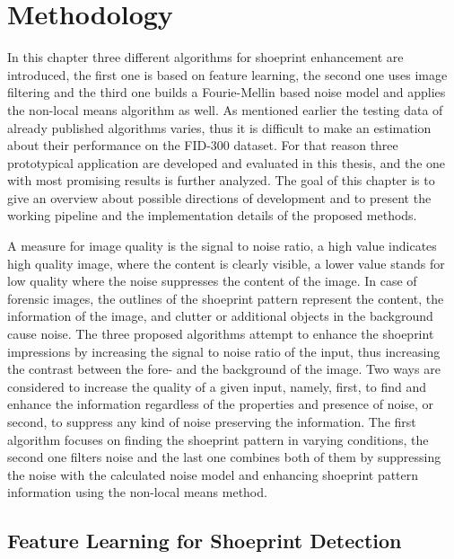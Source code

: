 \documentclass[draft,final]{vutinfth} %
\begin{document}
\chapter{Methodology}

\par
In this chapter three different algorithms for shoeprint enhancement are introduced, the first one is based on feature learning, the second one uses image filtering and the third one builds a Fourie-Mellin based noise model and applies the non-local means algorithm as well.
As mentioned earlier the testing data of already published algorithms varies, thus it is difficult to make an estimation about their performance on the FID-300  \cite{kortylewski2014unsupervised} dataset.
For that reason three prototypical application are developed and evaluated in this thesis, and the one with most promising results is further analyzed.
The goal of this chapter is to give an overview about possible directions of development and to present the working pipeline and the implementation details of the proposed methods.
\par
A measure for image quality is the signal to noise ratio, a high value indicates high quality image, where the content is clearly visible, a lower value stands for low quality where the noise suppresses the content of the image.
In case of forensic images, the outlines of the shoeprint pattern represent the content, the information of the image, and clutter or additional objects in the background cause noise. 
The three proposed algorithms attempt to enhance the shoeprint impressions by increasing the signal to noise ratio of the input, thus increasing the contrast between the fore- and the background of the image.
Two ways are considered to increase the quality of a given input, namely, first, to find and enhance the information regardless of the properties and presence of noise, or second, to suppress any kind of noise preserving the information. 
The first algorithm focuses on finding the shoeprint pattern in varying conditions, the second one filters noise and the last one combines both of them by suppressing the noise with the calculated noise model and enhancing shoeprint pattern information using the non-local means method.

\section{Feature Learning for Shoeprint Detection}
\end{document}
